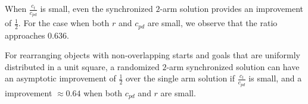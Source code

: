 When $\frac{c_t}{c_{pd}}$ is small, even the synchronized $2$-arm solution provides an improvement of $\frac{1}{2}$. For the case when both $r$ and $c_{pd}$ are small, we observe that the ratio approaches $0.636$. 
\vspace{-0.08in}
\begin{theorem}
For rearranging objects with non-overlapping starts and goals that are 
uniformly distributed in a unit square,  a randomized $2$-arm synchronized solution can have an 
asymptotic improvement of $\frac{1}{2}$ over the single arm solution if $\frac{c_t}{c_{pd}}$ is small, and a improvement $\approx 0.64$ when both $c_{pd}$ and $r$ are small. 
\end{theorem}






